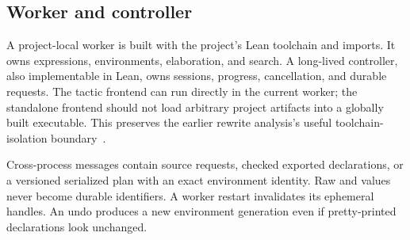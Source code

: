 \subsection{Worker and controller}

A project-local worker is built with the project's Lean toolchain and imports.
It owns expressions, environments, elaboration, and search. A long-lived
controller, also implementable in Lean, owns sessions, progress, cancellation,
and durable requests. The tactic frontend can run directly in the current
worker; the standalone frontend should not load arbitrary project artifacts
into a globally built executable. This preserves the earlier rewrite analysis's
useful toolchain-isolation boundary~\cite{earlier-rewrite}.

Cross-process messages contain source requests, checked exported declarations,
or a versioned serialized plan with an exact environment identity. Raw
 and  values never become durable identifiers. A worker
restart invalidates its ephemeral handles. An undo produces a new environment
generation even if pretty-printed declarations look unchanged.
